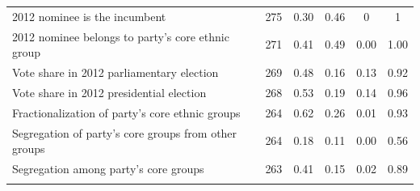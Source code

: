 \begin{table}[!htbp]
\begin{tabular}{@{\extracolsep{3pt}}lccccc}
2012 nominee is the incumbent & 275 & 0.30 & 0.46 & 0 & 1 \\ 
2012 nominee belongs to party's core ethnic group & 271 & 0.41 & 0.49 & 0.00 & 1.00 \\ 
Vote share in 2012 parliamentary election & 269 & 0.48 & 0.16 & 0.13 & 0.92 \\ 
Vote share in 2012 presidential election & 268 & 0.53 & 0.19 & 0.14 & 0.96 \\ 
Fractionalization of party's core ethnic groups & 264 & 0.62 & 0.26 & 0.01 & 0.93 \\ 
Segregation of party's core groups from other groups & 264 & 0.18 & 0.11 & 0.00 & 0.56 \\ 
Segregation among party's core groups & 263 & 0.41 & 0.15 & 0.02 & 0.89 \\ 
\hline \\[-1.8ex] 
\end{tabular} 
\end{table} 
